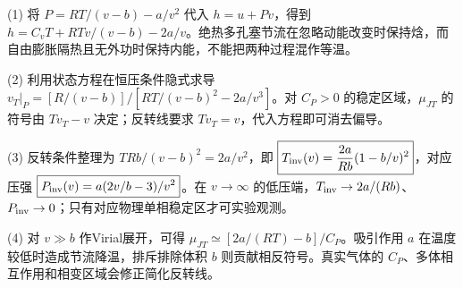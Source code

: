 (1) 将 \(P=RT/(v-b)-a/v^2\) 代入 \(h=u+Pv\)，得到 \(\boxed{h=C_vT+RTv/(v-b)-2a/v}\)。绝热多孔塞节流在忽略动能改变时保持焓，而自由膨胀隔热且无外功时保持内能，不能把两种过程混作等温。

(2) 利用状态方程在恒压条件隐式求导 \(v_T|_P=[R/(v-b)]/[RT/(v-b)^2-2a/v^3]\)。对 \(C_P>0\) 的稳定区域，\(\mu_{JT}\) 的符号由 \(Tv_T-v\) 决定；反转线要求 \(T v_T=v\)，代入方程即可消去偏导。

(3) 反转条件整理为 \(TRb/(v-b)^2=2a/v^2\)，即 \(\boxed{T_{\rm inv}(v)=\frac{2a}{Rb}(1-b/v)^2}\)，对应压强 \(\boxed{P_{\rm inv}(v)=a(2v/b-3)/v^2}\)。在 \(v\to\infty\) 的低压端，\(T_{\rm inv}\to2a/(Rb)\)、\(P_{\rm inv}\to0\)；只有对应物理单相稳定区才可实验观测。

(4) 对 \(v\gg b\) 作Virial展开，可得 \(\mu_{JT}\simeq[2a/(RT)-b]/C_P\)。吸引作用 \(a\) 在温度较低时造成节流降温，排斥排除体积 \(b\) 则贡献相反符号。真实气体的 \(C_P\)、多体相互作用和相变区域会修正简化反转线。
